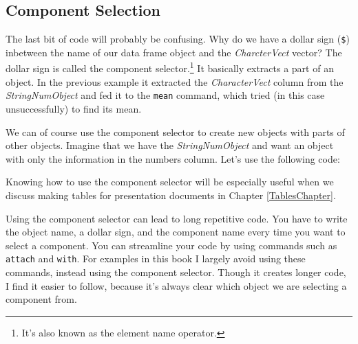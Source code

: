 \subsection{Component Selection}

The last bit of code will probably be confusing. Why do we have a dollar sign (\texttt{\$}) inbetween the name of our data frame object and the {\emph{CharcterVect}} vector? The dollar sign is called the component selector.\footnote{It's also known as the element name operator.} It basically extracts a part of an object. In the previous example it extracted the {\emph{CharacterVect}} column from the {\emph{StringNumObject}} and fed it to the \texttt{mean} command, which tried (in this case unsuccessfully) to find its mean.

We can of course use the component selector to create new objects with parts of other objects. Imagine that we have the {\emph{StringNumObject}} and want an object with only the information in the numbers column. Let's use the following code:

\begin{knitrout}
\color{fgcolor}
\end{knitrout}


\noindent Knowing how to use the component selector will be especially useful when we discuss making tables for presentation documents in Chapter \ref{TablesChapter}.

Using the component selector can lead to long repetitive code. You have to write the object name, a dollar sign, and the component name every time you want to select a component. You can streamline your code by using commands such as \texttt{attach} and \texttt{with}. For examples in this book I largely avoid using these commands, instead using the component selector. Though it creates longer code, I find it easier to follow, because it's always clear which object we are selecting a component from.

